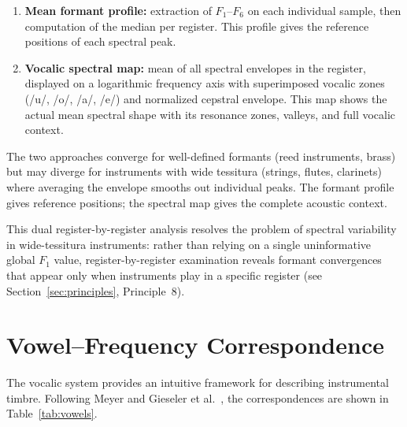 \documentclass[12pt,a4paper]{article}
\begin{document}
\begin{enumerate}
\item \textbf{Mean formant profile:} extraction of $F_1$--$F_6$ on each
individual sample, then computation of the median per register. This profile
gives the reference positions of each spectral peak.

\item \textbf{Vocalic spectral map:} mean of all spectral envelopes in the
register, displayed on a logarithmic frequency axis with superimposed vocalic
zones (/u/, /o/, /a/, /e/) and normalized cepstral envelope. This map shows the
actual mean spectral shape with its resonance zones, valleys, and full vocalic
context.
\end{enumerate}

The two approaches converge for well-defined formants (reed instruments, brass)
but may diverge for instruments with wide tessitura (strings, flutes, clarinets)
where averaging the envelope smooths out individual peaks. The formant profile
gives reference positions; the spectral map gives the complete acoustic context.

This dual register-by-register analysis resolves the problem of spectral
variability in wide-tessitura instruments: rather than relying on a single
uninformative global $F_1$ value, register-by-register examination reveals
formant convergences that appear only when instruments play in a specific
register (see Section~\ref{sec:principles}, Principle~8).

\section{Vowel--Frequency Correspondence}

The vocalic system provides an intuitive framework for describing instrumental
timbre. Following Meyer \citep{Meyer2009} and Gieseler et al.\
\citep{Gieseler1985}, the correspondences are shown in
Table~\ref{tab:vowels}.
\end{document}
